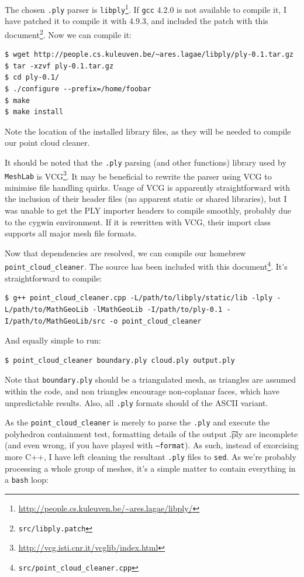 The chosen {\tt .ply} parser is {\tt libply}\footnote{\url{http://people.cs.kuleuven.be/~ares.lagae/libply/}}. If {\tt gcc} 4.2.0 is not available to compile it, I have patched it to compile it with 4.9.3, and included the patch with this document\footnote{{\tt src/libply.patch}}. Now we can compile it:

\begin{lstlisting}
$ wget http://people.cs.kuleuven.be/~ares.lagae/libply/ply-0.1.tar.gz
$ tar -xzvf ply-0.1.tar.gz
$ cd ply-0.1/
$ ./configure --prefix=/home/foobar
$ make
$ make install
\end{lstlisting}

Note the location of the installed library files, as they will be needed to compile our point cloud cleaner.

It should be noted that the {\tt .ply} parsing (and other functions) library used by {\tt MeshLab} is VCG\footnote{\url{http://vcg.isti.cnr.it/vcglib/index.html}}. It may be beneficial to rewrite the parser using VCG to minimise file handling quirks. Usage of VCG is apparently straightforward with the inclusion of their header files (no apparent static or shared libraries), but I was unable to get the PLY importer headers to compile smoothly, probably due to the cygwin environment. If it is rewritten with VCG, their import class supports all major mesh file formats.

Now that dependencies are resolved, we can compile our homebrew {\tt point\_cloud\_cleaner}. The source has been included with this document\footnote{{\tt src/point\_cloud\_cleaner.cpp}}. It's straightforward to compile:

\begin{lstlisting}
$ g++ point_cloud_cleaner.cpp -L/path/to/libply/static/lib -lply -L/path/to/MathGeoLib -lMathGeoLib -I/path/to/ply-0.1 -I/path/to/MathGeoLib/src -o point_cloud_cleaner
\end{lstlisting}

And equally simple to run:

\begin{lstlisting}
$ point_cloud_cleaner boundary.ply cloud.ply output.ply
\end{lstlisting}

Note that {\tt boundary.ply} should be a triangulated mesh, as triangles are assumed within the code, and non triangles encourage non-coplanar faces, which have unpredictable results. Also, all {\tt .ply} formats should of the ASCII variant.

As the {\tt point\_cloud\_cleaner} is merely to parse the {\tt .ply} and execute the polyhedron containment test, formatting details of the output {\t .ply} are incomplete (and even wrong, if you have played with {\tt --format}). As such, instead of exorcising more C++, I have left cleaning the resultant {\tt .ply} files to {\tt sed}. As we're probably processing a whole group of meshes, it's a simple matter to contain everything in a {\tt bash} loop:

